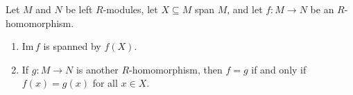 Let $M$ and $N$ be left $R$-modules, let $X \subseteq M$ span $M$, and let $f: M \to N$ be an $R$-homomorphism.

\begin{enumerate}
  \item $\text{Im}\, f$ is spanned by $f(X)$.
  \item If $g: M \to N$ is another $R$-homomorphism, then $f = g$ if and only if $f(x) = g(x)$ for all $x \in X$.
\end{enumerate}
